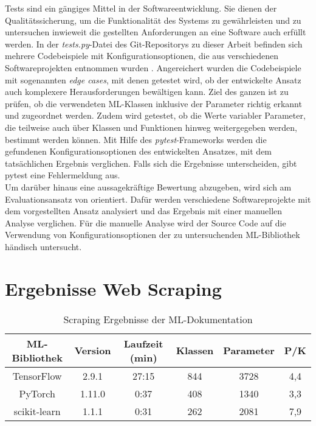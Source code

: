 \documentclass[german,bachelor]{swsLeipzig}
\begin{document}
Tests sind ein gängiges Mittel in der Softwareentwicklung.
Sie dienen der Qualitätssicherung, um die Funktionalität des Systems zu gewährleisten und zu untersuchen inwieweit
die gestellten Anforderungen an eine Software auch erfüllt werden.
In der \textit{tests.py}-Datei des Git-Repositorys zu dieser Arbeit befinden sich mehrere Codebeispiele mit Konfigurationsoptionen, die aus
verschiedenen Softwareprojekten entnommen wurden \cite[]{marco}.
Angereichert wurden die Codebeispiele mit sogenannten \textit{edge cases}, mit denen getestet wird, ob der entwickelte
Ansatz auch komplexere Herausforderungen bewältigen kann.
Ziel des ganzen ist zu prüfen, ob die verwendeten ML-Klassen inklusive der Parameter richtig erkannt und zugeordnet werden.
Zudem wird getestet, ob die Werte variabler Parameter, die teilweise auch über Klassen und Funktionen hinweg weitergegeben werden,
bestimmt werden können.
Mit Hilfe des \textit{pytest}-Frameworks werden die gefundenen Konfigurationsoptionen des entwickelten Ansatzes,
mit dem tatsächlichen Ergebnis verglichen.
Falls sich die Ergebnisse unterscheiden, gibt pytest eine Fehlermeldung aus.\\

Um darüber hinaus eine aussagekräftige Bewertung abzugeben, wird sich am Evaluationsansatz von \citeauthor{10.1145/1985793.1985812}
orientiert.
Dafür werden verschiedene Softwareprojekte mit dem vorgestellten Ansatz analysiert und das Ergebnis mit einer manuellen Analyse verglichen.
Für die manuelle Analyse wird der Source Code auf die Verwendung von Konfigurationsoptionen der zu untersuchenden ML-Bibliothek
händisch untersucht.\\

\section{Ergebnisse Web Scraping}
\begin{table}[H]
\small
\begin{center}
\begin{tabular}[h]{c|c|c|c|c|c}
\hline
ML-Bibliothek & Version & Laufzeit (min) & Klassen & Parameter & P/K\\
\hline \hline
TensorFlow & 2.9.1 & 27:15 & 844 & 3728 & 4,4\\
PyTorch & 1.11.0 & 0:37 & 408 & 1340 & 3,3 \\
scikit-learn & 1.1.1 & 0:31 & 262 & 2081 & 7,9\\
\hline
\end{tabular}
\caption{Scraping Ergebnisse der ML-Dokumentation} \label{scrapresults}
\end{center}
\end{table}
\end{document}
